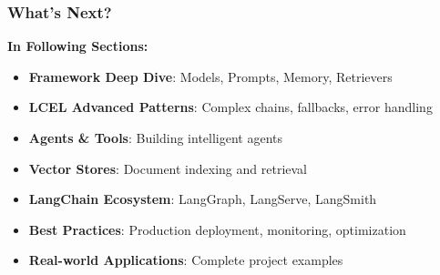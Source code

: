 \begin{frame}\frametitle{What's Next?}

\textbf{In Following Sections:}
\begin{itemize}
\item \textbf{Framework Deep Dive}: Models, Prompts, Memory, Retrievers
\item \textbf{LCEL Advanced Patterns}: Complex chains, fallbacks, error handling
\item \textbf{Agents \& Tools}: Building intelligent agents
\item \textbf{Vector Stores}: Document indexing and retrieval
\item \textbf{LangChain Ecosystem}: LangGraph, LangServe, LangSmith
\item \textbf{Best Practices}: Production deployment, monitoring, optimization
\item \textbf{Real-world Applications}: Complete project examples
\end{itemize}

\end{frame}